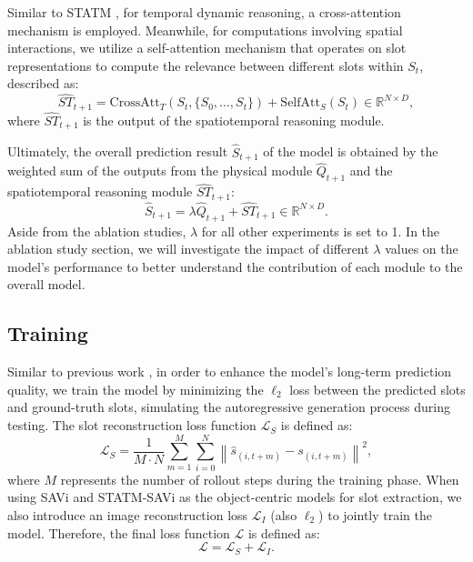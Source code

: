 \documentclass[sigconf]{acmart}
\begin{document}
Similar to STATM \cite{li2024reasoningenhanced}, for temporal dynamic reasoning, a cross-attention mechanism is employed. Meanwhile, for computations involving spatial interactions, we utilize a self-attention mechanism that operates on slot representations to compute the relevance between different slots within $S_t$, described as: 
\begin{equation}
\label{eq5}
\widehat{ST}_{t+1} = \mathrm{CrossAtt}_T(S_t,\{S_0, \dots, S_t\})+\mathrm{SelfAtt}_S(S_t) \in \mathbb{R}^{N \times D} ,
\end{equation}
where $\widehat{ST}_{t+1}$ is the output of the spatiotemporal reasoning module.

Ultimately, the overall prediction result $\widehat{S}_{t+1}$ of the model is obtained by the weighted sum of the outputs from the physical module $\widehat{Q}_{t+1}$ and the spatiotemporal reasoning module $\widehat{ST}_{t+1}$: 
\begin{equation}
\label{eq6}
\widehat{S}_{t+1} = \lambda \widehat{Q}_{t+1} + \widehat{ST}_{t+1} \in \mathbb{R}^{N \times D} .
\end{equation}
Aside from the ablation studies, $\lambda$ for all other experiments is set to 1. In the ablation study section, we will investigate the impact of different $\lambda$ values on the model's performance to better understand the contribution of each module to the overall model.

\subsection{Training}

Similar to previous work \cite{kipf2021conditional, li2024reasoningenhanced}, in order to enhance the model's long-term prediction quality, we train the model by minimizing the $\ell_2$ loss between the predicted slots and ground-truth slots, simulating the autoregressive generation process during testing. The slot reconstruction loss function $\mathcal{L}_S$ is defined as:  
\begin{equation}
\label{eq7}
\mathcal{L}_S = \frac{1}{M \cdot N} \sum_{m=1}^{M} \sum_{i=0}^{N} \left\| \hat{s}_{(i,t+m)} - s_{(i,t+m)} \right\|^2,
\end{equation}
where $M$ represents the number of rollout steps during the training phase. When using SAVi and STATM-SAVi as the object-centric models for slot extraction, we also introduce an image reconstruction loss $\mathcal{L}_I$ (also $\ell_2$) to jointly train the model. Therefore, the final loss function $\mathcal{L}$ is defined as:
\begin{equation}
\label{eq8}
\mathcal{L} = \mathcal{L}_S + \mathcal{L}_I .
\end{equation}
\end{document}

